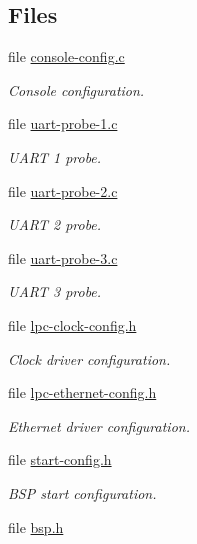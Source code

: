 \subsection*{Files}
\begin{DoxyCompactItemize}
\item 
file \mbox{\hyperlink{arm_2lpc24xx_2console_2console-config_8c}{console-\/config.\+c}}
\begin{DoxyCompactList}\small\item\em Console configuration. \end{DoxyCompactList}\item 
file \mbox{\hyperlink{uart-probe-1_8c}{uart-\/probe-\/1.\+c}}
\begin{DoxyCompactList}\small\item\em U\+A\+RT 1 probe. \end{DoxyCompactList}\item 
file \mbox{\hyperlink{uart-probe-2_8c}{uart-\/probe-\/2.\+c}}
\begin{DoxyCompactList}\small\item\em U\+A\+RT 2 probe. \end{DoxyCompactList}\item 
file \mbox{\hyperlink{uart-probe-3_8c}{uart-\/probe-\/3.\+c}}
\begin{DoxyCompactList}\small\item\em U\+A\+RT 3 probe. \end{DoxyCompactList}\item 
file \mbox{\hyperlink{lpc24xx_2include_2bsp_2lpc-clock-config_8h}{lpc-\/clock-\/config.\+h}}
\begin{DoxyCompactList}\small\item\em Clock driver configuration. \end{DoxyCompactList}\item 
file \mbox{\hyperlink{lpc24xx_2include_2bsp_2lpc-ethernet-config_8h}{lpc-\/ethernet-\/config.\+h}}
\begin{DoxyCompactList}\small\item\em Ethernet driver configuration. \end{DoxyCompactList}\item 
file \mbox{\hyperlink{start-config_8h}{start-\/config.\+h}}
\begin{DoxyCompactList}\small\item\em B\+SP start configuration. \end{DoxyCompactList}\item 
file \mbox{\hyperlink{bsps_2arm_2lpc24xx_2include_2bsp_8h}{bsp.\+h}}

\end{DoxyCompactItemize}
